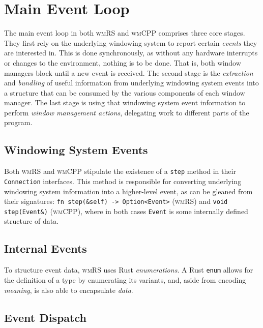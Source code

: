 \section{Main Event Loop}

The main  event loop  in both \textsc{wmRS}  and \textsc{wmCPP}  comprises three
core  stages. They  first  rely on  the underlying  windowing  system to  report
certain \textit{events} they  are interested in. This is  done synchronously, as
without any hardware interrupts or changes  to the environment, nothing is to be
done.  That is,  both  window managers  block  until a  new  event is  received.
The  second stage  is the  \textit{extraction} and  \textit{bundling} of  useful
information from underlying windowing system events into a structure that can be
consumed  by the  various  components of  each window  manager.  The last  stage
is  using that  windowing  system event  information  to perform  \textit{window
management actions}, delegating work to different parts of the program.

\subsection{Windowing System Events}

Both \textsc{wmRS} and \textsc{wmCPP} stipulate the existence of a \texttt{step}
method in their  \texttt{Connection} interfaces. This method  is responsible for
converting underlying  windowing system  information into a  higher-level event,
as  can  be  gleaned  from their  signatures:  \texttt{fn  step(&self)
->  Option<Event>}   (\textsc{wmRS})  and   \texttt{void  step(Event&)}
(\textsc{wmCPP}), where in both cases  \texttt{Event} is some internally defined
structure of data.

\subsection{Internal Events}



To  structure  event  data,  \textsc{wmRS} uses  Rust  \textit{enumerations}.  A
Rust  \texttt{enum} allows  for  the definition  of a  type  by enumerating  its
variants, and, aside from encoding \textit{meaning}, is also able to encapsulate
\textit{data}.

\subsection{Event Dispatch}
{ \textcolor{gray}\blindtext }
